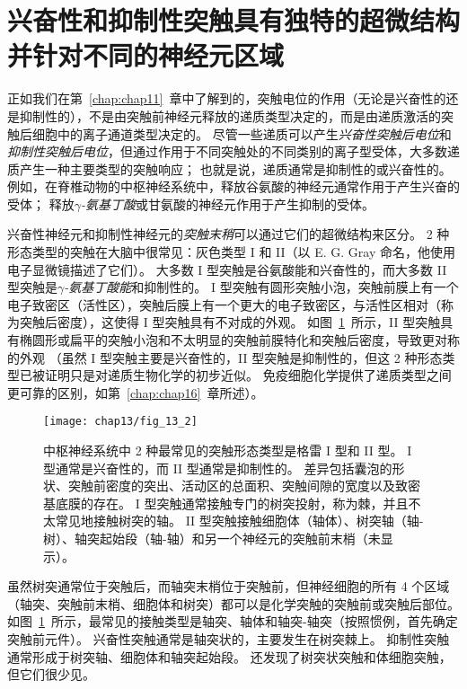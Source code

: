 \section{兴奋性和抑制性突触具有独特的超微结构并针对不同的神经元区域}

正如我们在第~\ref{chap:chap11}~章中了解到的，突触电位的作用（无论是兴奋性的还是抑制性的），不是由突触前神经元释放的递质类型决定的，而是由递质激活的突触后细胞中的离子通道类型决定的。
尽管一些递质可以产生\textit{兴奋性突触后电位}和\textit{抑制性突触后电位}，但通过作用于不同突触处的不同类别的离子型受体，大多数递质产生一种主要类型的突触响应；
也就是说，递质通常是抑制性的或兴奋性的。
例如，在脊椎动物的中枢神经系统中，释放谷氨酸的神经元通常作用于产生兴奋的受体；
释放\textit{$\gamma$-氨基丁酸}或甘氨酸的神经元作用于产生抑制的受体。


兴奋性神经元和抑制性神经元的\textit{突触末稍}可以通过它们的超微结构来区分。
2 种形态类型的突触在大脑中很常见：灰色类型 I 和 II（以 E. G. Gray 命名，他使用电子显微镜描述了它们）。
大多数 I 型突触是谷氨酸能和兴奋性的，而大多数 II 型突触是\textit{$\gamma$-氨基丁酸能}和抑制性的。
I 型突触有圆形突触小泡，突触前膜上有一个电子致密区（活性区），突触后膜上有一个更大的电子致密区，与活性区相对（称为突触后密度），这使得 I 型突触具有不对成的外观。
如图~\ref{fig:13_2}~所示，II 型突触具有椭圆形或扁平的突触小泡和不太明显的突触前膜特化和突触后密度，导致更对称的外观
（虽然 I 型突触主要是兴奋性的，II 型突触是抑制性的，但这 2 种形态类型已被证明只是对递质生物化学的初步近似。
免疫细胞化学提供了递质类型之间更可靠的区别，如第~\ref{chap:chap16}~章所述）。


\begin{figure}[htbp]
	\centering
	\texttt{[image: chap13/fig\_13\_2]}
	\caption{中枢神经系统中 2 种最常见的突触形态类型是格雷 I 型和 II 型。
		I 型通常是兴奋性的，而 II 型通常是抑制性的。
		差异包括囊泡的形状、突触前密度的突出、活动区的总面积、突触间隙的宽度以及致密基底膜的存在。
		I 型突触通常接触专门的树突投射，称为棘，并且不太常见地接触树突的轴。
		II 型突触接触细胞体（轴体）、树突轴（轴-树）、轴突起始段（轴-轴）和另一个神经元的突触前末梢（未显示）。}
	\label{fig:13_2}
\end{figure}


虽然树突通常位于突触后，而轴突末梢位于突触前，但神经细胞的所有 4 个区域（轴突、突触前末梢、细胞体和树突）都可以是化学突触的突触前或突触后部位。
如图~\ref{fig:13_2}~所示，最常见的接触类型是轴突、轴体和轴突-轴突（按照惯例，首先确定突触前元件）。
兴奋性突触通常是轴突状的，主要发生在树突棘上。
抑制性突触通常形成于树突轴、细胞体和轴突起始段。
还发现了树突状突触和体细胞突触，但它们很少见。


